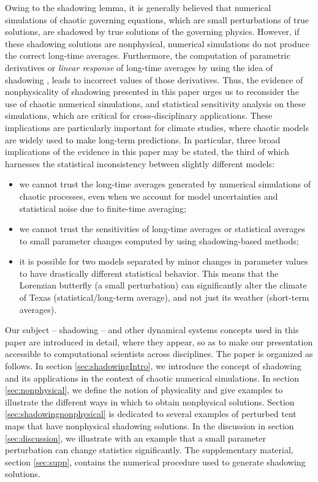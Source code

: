 \documentclass[preprint,12pt]{elsarticle}
\begin{document}
Owing to the shadowing lemma, it is generally believed that numerical simulations of chaotic governing equations, which are small perturbations of true solutions, are shadowed by true solutions of the governing physics. However, if these shadowing solutions are nonphysical, numerical simulations do not produce the correct long-time averages. Furthermore, the computation of parametric derivatives or {\em linear response} of 
long-time averages by using the idea of shadowing \cite{qiqi-lss}, leads to incorrect values of those derivatives. Thus, the evidence of nonphysicality of shadowing presented in this paper urges us to reconsider the use of chaotic numerical simulations, and statistical sensitivity analysis on these simulations, which are critical for cross-disciplinary applications. These implications are particularly important for climate studies, where chaotic models are widely used to make long-term predictions. In particular, three broad implications of the evidence in this paper may be stated, the third of which harnesses the statistical inconsistency between slightly different models:
\begin{itemize}
    \item we cannot trust the long-time averages generated by numerical simulations of chaotic processes, even when we account for model uncertainties and statistical noise due to finite-time averaging;
    \item we cannot trust the sensitivities of long-time averages or statistical averages to small parameter changes computed by using shadowing-based methods;
	\item it is possible for two models separated by minor changes in parameter values to have drastically different statistical behavior. This means that the Lorenzian butterfly (a small perturbation) can significantly alter the climate of Texas (statistical/long-term average), and not just its weather (short-term averages).
\end{itemize}
Our subject -- shadowing -- and other dynamical systems concepts used in this paper are introduced in detail, where they appear, so as to make our presentation accessible to computational scientists across disciplines. 
The paper is organized as follows. In section \ref{sec:shadowingIntro}, we introduce the concept of shadowing and its applications in the context of chaotic numerical simulations. In section \ref{sec:nonphysical}, we define the notion of physicality and give examples to illustrate the different ways in which to obtain nonphysical solutions. Section \ref{sec:shadowingnonphysical} is dedicated to several examples of perturbed tent maps that have nonphysical shadowing solutions. In the discussion in section \ref{sec:discussion}, we illustrate with an example that a small parameter perturbation can change statistics significantly. The supplementary material, section \ref{sec:supp}, contains the numerical procedure used to generate shadowing solutions.
\end{document}

